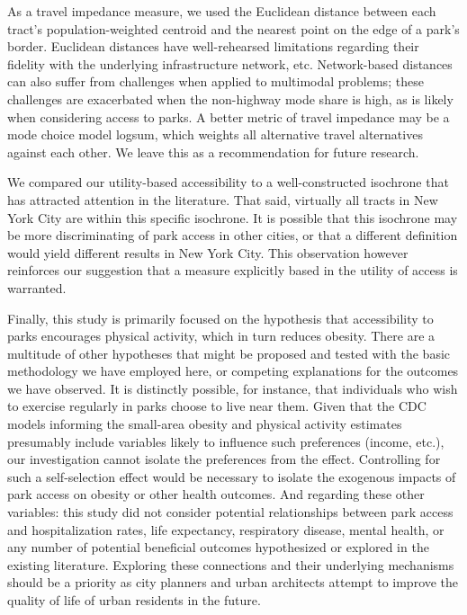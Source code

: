 \documentclass[Afour,sageh.bst]{sagej}
\begin{document}
As a travel impedance measure, we used the Euclidean distance between
each tract's population-weighted centroid and the nearest point on the
edge of a park's border. Euclidean distances have well-rehearsed
limitations regarding their fidelity with the underlying infrastructure
network, etc. Network-based distances can also suffer from challenges
when applied to multimodal problems; these challenges are exacerbated
when the non-highway mode share is high, as is likely when considering
access to parks. A better metric of travel impedance may be a mode
choice model logsum, which weights all alternative travel alternatives
against each other. We leave this as a recommendation for future
research.

We compared our utility-based accessibility to a well-constructed
isochrone that has attracted attention in the literature. That said,
virtually all tracts in New York City are within this specific
isochrone. It is possible that this isochrone may be more discriminating
of park access in other cities, or that a different definition would
yield different results in New York City. This observation however
reinforces our suggestion that a measure explicitly based in the utility
of access is warranted.

Finally, this study is primarily focused on the hypothesis that
accessibility to parks encourages physical activity, which in turn
reduces obesity. There are a multitude of other hypotheses that might be
proposed and tested with the basic methodology we have employed here, or
competing explanations for the outcomes we have observed. It is
distinctly possible, for instance, that individuals who wish to exercise
regularly in parks choose to live near them. Given that the CDC models
informing the small-area obesity and physical activity estimates
presumably include variables likely to influence such preferences
(income, etc.), our investigation cannot isolate the preferences from
the effect. Controlling for such a self-selection effect would be
necessary to isolate the exogenous impacts of park access on obesity or
other health outcomes. And regarding these other variables: this study
did not consider potential relationships between park access and
hospitalization rates, life expectancy, respiratory disease, mental
health, or any number of potential beneficial outcomes hypothesized or
explored in the existing literature. Exploring these connections and
their underlying mechanisms should be a priority as city planners and
urban architects attempt to improve the quality of life of urban
residents in the future.
\end{document}
